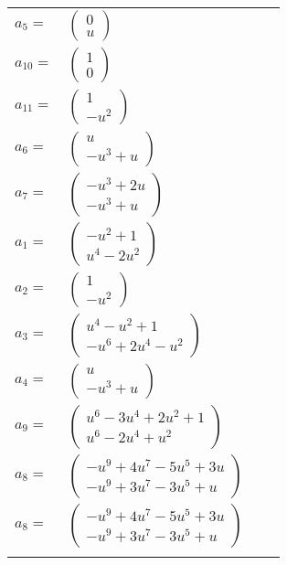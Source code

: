 \documentclass[1p]{elsarticle_modified}
\theoremstyle{definition}
\begin{document}
\begin{tabular}{m{7pt} m{180pt} m{7pt} m{180pt} }
\flushright $a_{5}=$&$\begin{pmatrix}0\\u\end{pmatrix}$ \\
\flushright $a_{10}=$&$\begin{pmatrix}1\\0\end{pmatrix}$ \\
\flushright $a_{11}=$&$\begin{pmatrix}1\\- u^2\end{pmatrix}$ \\
\flushright $a_{6}=$&$\begin{pmatrix}u\\- u^3+u\end{pmatrix}$ \\
\flushright $a_{7}=$&$\begin{pmatrix}- u^3+2 u\\- u^3+u\end{pmatrix}$ \\
\flushright $a_{1}=$&$\begin{pmatrix}- u^2+1\\u^4-2 u^2\end{pmatrix}$ \\
\flushright $a_{2}=$&$\begin{pmatrix}1\\- u^2\end{pmatrix}$ \\
\flushright $a_{3}=$&$\begin{pmatrix}u^4- u^2+1\\- u^6+2 u^4- u^2\end{pmatrix}$ \\
\flushright $a_{4}=$&$\begin{pmatrix}u\\- u^3+u\end{pmatrix}$ \\
\flushright $a_{9}=$&$\begin{pmatrix}u^6-3 u^4+2 u^2+1\\u^6-2 u^4+u^2\end{pmatrix}$ \\
\flushright $a_{8}=$&$\begin{pmatrix}- u^9+4 u^7-5 u^5+3 u\\- u^9+3 u^7-3 u^5+u\end{pmatrix}$\\ \flushright $a_{8}=$&$\begin{pmatrix}- u^9+4 u^7-5 u^5+3 u\\- u^9+3 u^7-3 u^5+u\end{pmatrix}$\\&\end{tabular}
\end{document}
